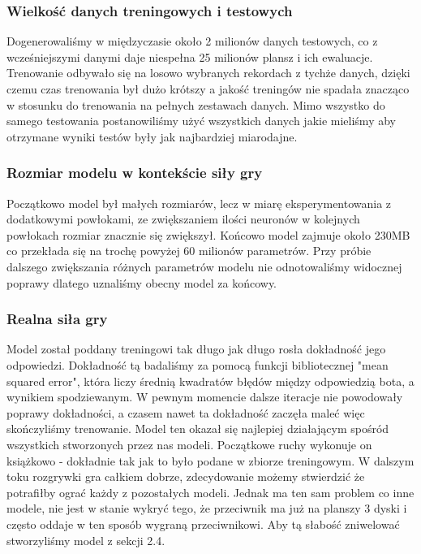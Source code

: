\documentclass[12pt]{article}
\begin{document}
\subsubsection{Wielkość danych treningowych i testowych}

Dogenerowaliśmy w międzyczasie około 2 milionów danych testowych, co z wcześniejszymi danymi daje niespełna 25 milionów plansz i ich ewaluacje. Trenowanie odbywało się na losowo wybranych rekordach z tychże danych, dzięki czemu czas trenowania był dużo krótszy a jakość treningów nie spadała znacząco w stosunku do trenowania na pełnych zestawach danych. Mimo wszystko do samego testowania postanowiliśmy użyć wszystkich danych jakie mieliśmy aby otrzymane wyniki testów były jak najbardziej miarodajne.

\subsubsection{Rozmiar modelu w kontekście siły gry}

Początkowo model był małych rozmiarów, lecz w miarę eksperymentowania z dodatkowymi powłokami, ze zwiększaniem ilości neuronów w kolejnych powłokach rozmiar znacznie się zwiększył. Końcowo model zajmuje około 230MB co przekłada się na trochę powyżej 60 milionów parametrów. Przy próbie dalszego zwiększania różnych parametrów modelu nie odnotowaliśmy widocznej poprawy dlatego uznaliśmy obecny model za końcowy.

\subsubsection{Realna siła gry}

Model został poddany treningowi tak długo jak długo rosła dokładność jego odpowiedzi. Dokładność tą badaliśmy za pomocą funkcji bibliotecznej "mean squared error", która liczy średnią kwadratów błędów między odpowiedzią bota, a wynikiem spodziewanym. W pewnym momencie dalsze iteracje nie powodowały poprawy dokładności, a czasem nawet ta dokładność zaczęła maleć więc skończyliśmy trenowanie. Model ten okazał się najlepiej działającym spośród wszystkich stworzonych przez nas modeli. Początkowe ruchy wykonuje on książkowo - dokładnie tak jak to było podane w zbiorze treningowym. W dalszym toku rozgrywki gra całkiem dobrze, zdecydowanie możemy stwierdzić że potrafiłby ograć każdy z pozostałych modeli. Jednak ma ten sam problem co inne modele, nie jest w stanie wykryć tego, że przeciwnik ma już na planszy 3 dyski i często oddaje w ten sposób wygraną przeciwnikowi. Aby tą słabość zniwelować stworzyliśmy model z sekcji 2.4.
\end{document}

